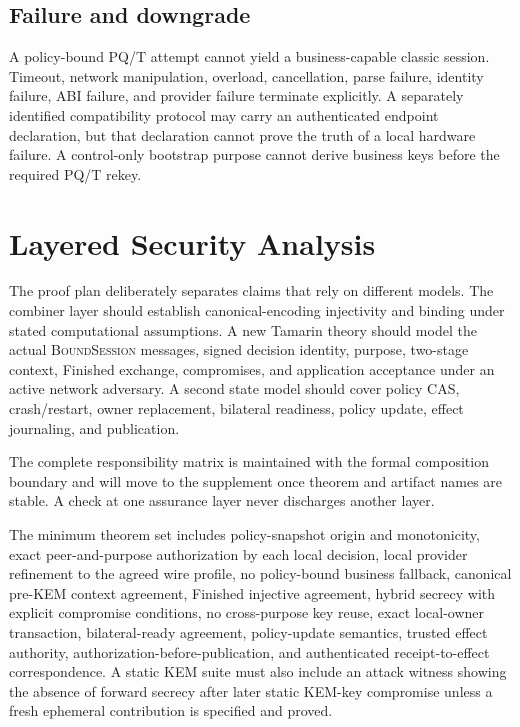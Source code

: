 \documentclass[journal]{IEEEtran}
\newcommand{\system}{\textsc{BoundSession}}
\begin{document}
\subsection{Failure and downgrade}
A policy-bound PQ/T attempt cannot yield a business-capable classic session.
Timeout, network manipulation, overload, cancellation, parse failure, identity
failure, ABI failure, and provider failure terminate explicitly. A separately
identified compatibility protocol may carry an authenticated endpoint
declaration, but that declaration cannot prove the truth of a local hardware
failure. A control-only bootstrap purpose cannot derive business keys before the
required PQ/T rekey.

\section{Layered Security Analysis}

The proof plan deliberately separates claims that rely on different models.
The combiner layer should establish canonical-encoding injectivity and binding
under stated computational assumptions. A new Tamarin theory should model the
actual \system{} messages, signed decision identity, purpose, two-stage context,
Finished exchange, compromises, and application acceptance under an active
network adversary. A second state model should cover policy CAS, crash/restart,
owner replacement, bilateral readiness, policy update, effect journaling, and
publication.

The complete responsibility matrix is maintained with the formal composition
boundary and will move to the supplement once theorem and artifact names are
stable. A check at one assurance layer never discharges another layer.

The minimum theorem set includes policy-snapshot origin and monotonicity, exact
peer-and-purpose authorization by each local decision, local provider refinement
to the agreed wire profile, no policy-bound business fallback, canonical pre-KEM
context agreement, Finished injective agreement, hybrid secrecy with explicit
compromise conditions, no cross-purpose key reuse, exact local-owner transaction,
bilateral-ready agreement, policy-update semantics, trusted effect authority,
authorization-before-publication, and authenticated receipt-to-effect
correspondence. A static KEM
suite must also include an attack witness showing the absence of forward secrecy
after later static KEM-key compromise unless a fresh ephemeral contribution is
specified and proved.
\end{document}
